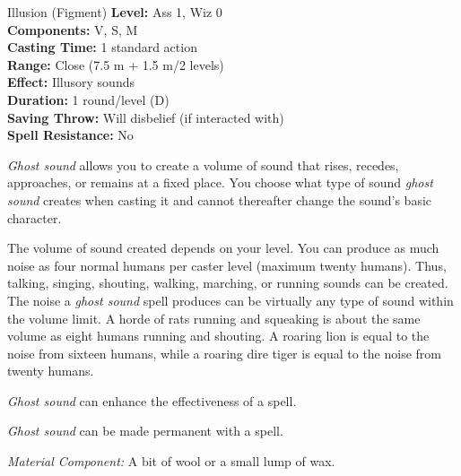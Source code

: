 {Illusion (Figment)}
{
	\textbf{Level:}
	Ass 1, Wiz 0\\
	\textbf{Components:}
	V, S, M\\
	\textbf{Casting Time:}
	1 standard action\\
	\textbf{Range:}
	Close (7.5 m + 1.5 m/2 levels)\\
	\textbf{Effect:}
	Illusory sounds\\
	\textbf{Duration:}
	1 round/level (D)\\
	\textbf{Saving Throw:}
	Will disbelief (if interacted with)\\
	\textbf{Spell Resistance:}
	No\\
}
{
	\emph{Ghost sound} allows you to create a volume of sound that rises, recedes, approaches, or remains at a fixed place. You choose what type of sound \emph{ghost sound} creates when casting it and cannot thereafter change the sound's basic character.

	The volume of sound created depends on your level. You can produce as much noise as four normal humans per caster level (maximum twenty humans). Thus, talking, singing, shouting, walking, marching, or running sounds can be created. The noise a \emph{ghost sound} spell produces can be virtually any type of sound within the volume limit. A horde of rats running and squeaking is about the same volume as eight humans running and shouting. A roaring lion is equal to the noise from sixteen humans, while a roaring dire tiger is equal to the noise from twenty humans.

	\emph{Ghost sound} can enhance the effectiveness of a  spell.

	\emph{Ghost sound} can be made permanent with a  spell.

	\textit{Material Component:}
	A bit of wool or a small lump of wax.

}

